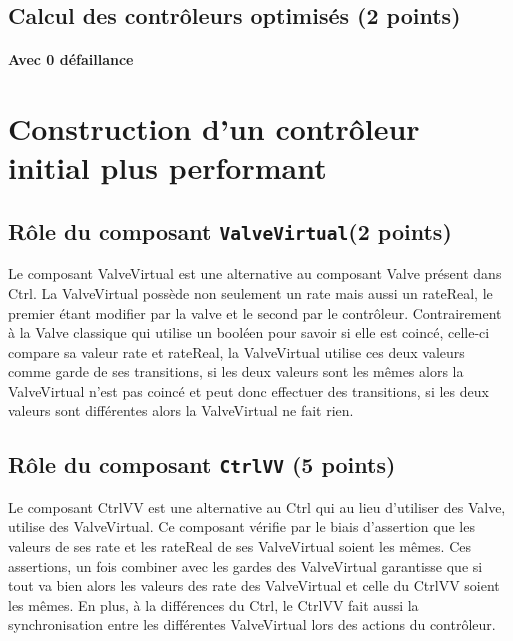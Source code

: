 \documentclass[a4paper]{book}
\begin{document}
\subsection{Calcul des contrôleurs optimisés (2 points)}


\paragraph{Avec 0 défaillance}


\section{Construction d'un contrôleur initial plus performant}
\subsection{Rôle du composant {\tt ValveVirtual}(2 points)}
\begin{flushleft}
    Le composant ValveVirtual est une alternative au composant Valve présent dans Ctrl.
    La ValveVirtual possède non seulement un rate mais aussi un rateReal, le premier étant modifier par la valve et le second par le contrôleur.
    Contrairement à la Valve classique qui utilise un booléen pour savoir si elle est coincé, celle-ci compare sa valeur rate et rateReal, la ValveVirtual utilise ces deux valeurs comme garde de ses transitions, si les deux valeurs sont les mêmes alors la ValveVirtual n'est pas coincé et peut donc effectuer des transitions, si les deux valeurs sont différentes alors la ValveVirtual ne fait rien.

\end{flushleft}

\subsection{Rôle du composant {\tt CtrlVV} (5 points)}

\begin{flushleft}
    Le composant CtrlVV est une alternative au Ctrl qui au lieu d'utiliser des Valve, utilise des ValveVirtual.
    Ce composant vérifie par le biais d'assertion que les valeurs de ses rate et les rateReal de ses ValveVirtual soient les mêmes.
    Ces assertions, un fois combiner avec les gardes des ValveVirtual garantisse que si tout va bien alors les valeurs des rate des ValveVirtual et celle du CtrlVV soient les mêmes.
    En plus, à la différences du Ctrl, le CtrlVV fait aussi la synchronisation entre les différentes ValveVirtual lors des actions du contrôleur.

\end{flushleft}
\end{document}
